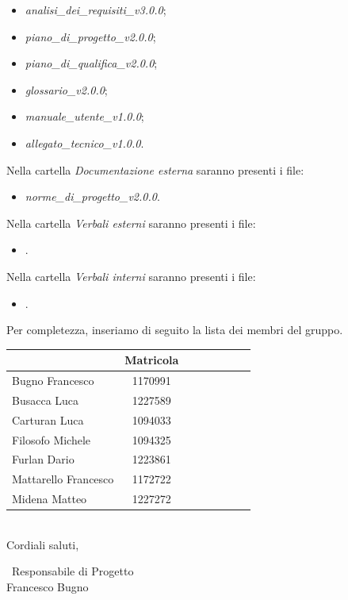 \documentclass[a4paper, 10pt]{article}
\begin{document}
\begin{itemize}
    \item \textit{analisi\_dei\_requisiti\_v3.0.0};
    \item \textit{piano\_di\_progetto\_v2.0.0};
    \item \textit{piano\_di\_qualifica\_v2.0.0};
    \item \textit{glossario\_v2.0.0};
    \item \textit{manuale\_utente\_v1.0.0};
    \item \textit{allegato\_tecnico\_v1.0.0}.
\end{itemize}
Nella cartella \textit{Documentazione esterna} saranno presenti i file:
\begin{itemize}
    \item \textit{norme\_di\_progetto\_v2.0.0}.
\end{itemize}
Nella cartella \textit{Verbali esterni} saranno presenti i file:
\begin{itemize}
    \item \textit{}.
\end{itemize}
Nella cartella \textit{Verbali interni} saranno presenti i file:
\begin{itemize}
    \item \textit{}.
\end{itemize}
Per completezza, inseriamo di seguito la lista dei membri del gruppo.
\begin{table}[H]
    \centering
    \renewcommand{\arraystretch}{1.8}
    \begin{tabular}{l|cccccc|c}
      \rowcolor[HTML]{125E28} 
      \multicolumn{1}{c}{\color[HTML]{FFFFFF}\textbf{Nome}} 
      & \color[HTML]{FFFFFF}\textbf{Matricola}\\
      \hline
      Bugno Francesco & 1170991\\
      Busacca Luca & 1227589\\
      Carturan Luca & 1094033\\
      Filosofo Michele & 1094325\\
      Furlan Dario & 1223861\\
      Mattarello Francesco & 1172722\\
      Midena Matteo & 1227272\\
      \hline             
    \end{tabular}
  \end{table}
\textbf{}\\
Cordiali saluti,\\
\begin{flushright}
    \
    Responsabile di Progetto\\
    Francesco Bugno \hspace{1.1cm}\hspace{1cm}
\end{flushright}
\end{document}
